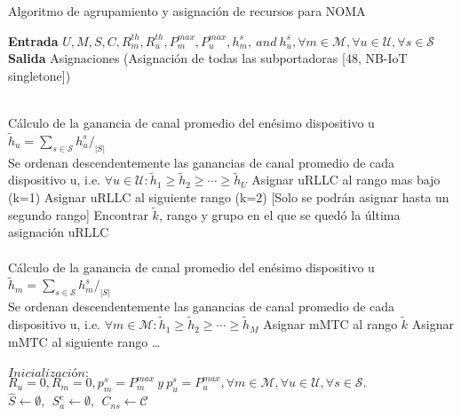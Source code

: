 \begin{algorithm}
    \caption{Algoritmo de agrupamiento y asignación de recursos para NOMA}\label{euclid}
    \hspace*{\algorithmicindent} \textbf{Entrada} $U, M, S, C , R_{m}^{th} , R_{u}^{th} , P_{m}^{max} , P_{u}^{max} , h_{m}^{s} , \ and \ h_{u}^{s} ,\forall m \in \mathcal {M} , \forall u \in \mathcal {U} , \forall s \in \mathcal {S}$  \\
    \hspace*{\algorithmicindent} \textbf{Salida} Asignaciones (Asignación de todas las subportadoras [48, NB-IoT singletone]) \\
     
    \begin{algorithmic}[1]
    \\
    Cálculo de la ganancia de canal promedio del enésimo dispositivo u\\
    ${\tilde h_{u}} =\sum \nolimits _{s \in \mathcal {S}} {h_{u}^{s}}{/_{|S|}}$\\
    Se ordenan descendentemente las ganancias de canal promedio de cada dispositivo u, i.e. $\forall u \in \mathcal {U} : {\tilde h_{1}} \geq {\tilde h_{2}} \geq \cdots \geq {\tilde h_{U}}$ 
        \State Asignar uRLLC al rango mas bajo (k=1)
        \Else
        \State Asignar uRLLC al siguiente rango (k=2) [Solo se podrán asignar hasta un segundo rango]
        \EndIf
    \EndFor
    \State Encontrar ${\tilde k}$, rango y grupo en el que se quedó la última asignación uRLLC
    \EndProcedure\\
    
    \\
    Cálculo de la ganancia de canal promedio del enésimo dispositivo u\\
    ${\tilde h_{m}} =\sum \nolimits _{s \in \mathcal {S}} {h_{m}^{s}}{/_{|S|}}$\\
    Se ordenan descendentemente las ganancias de canal promedio de cada dispositivo u, i.e. $\forall m \in \mathcal {M} : {\tilde h_{1}} \geq {\tilde h_{2}} \geq \cdots \geq {\tilde h_{M}}$ 
        \State Asignar mMTC al rango ${\tilde k}$
        \Else
        \State Asignar mMTC al siguiente rango \ldots
        \EndIf
    \EndFor
    \EndProcedure\\
    
    \\
    $Inicialización: $ \\${R_{u}} = 0 , {R_{m}} = 0 , p_{m}^{s}=P_{m}^{max} \ y \ p_{u}^{s}= P_{u}^{max} , \forall m \in \mathcal {M} , \forall u \in \mathcal {U} , \forall s \in \mathcal {S}.$\\ 
    ${\hat S} \leftarrow \emptyset,~~S_{a}^{c} \leftarrow \emptyset,~~{C_{ns}} \leftarrow \mathcal {C}$ \\


\end{algorithmic}
\end{algorithm}
